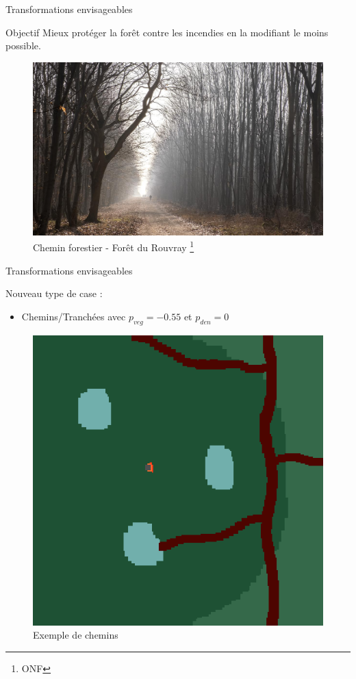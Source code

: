 \documentclass{beamer}
\begin{document}
\begin{frame}{Transformations envisageables \hyperlink{jump}{\beamerbutton{ }} \hypertarget{13}{\beamerbutton{ }}}
    \begin{block}{Objectif}
        Mieux protéger la forêt contre les incendies en la modifiant le moins possible.
    \end{block}

    \begin{figure}
        \centering
        \includegraphics[width=0.75\linewidth]{pictures/chemin.jpeg}
        \caption{Chemin forestier - Forêt du Rouvray \footnote{ONF}}
        \label{fig:enter-label}
    \end{figure}
\end{frame}

\begin{frame}{Transformations envisageables \hyperlink{jump}{\beamerbutton{ }} \hypertarget{14}{\beamerbutton{ }}}
    \begin{block}{Nouveau type de case :}
        \begin{itemize}
            \item Chemins/Tranchées avec $p_{veg} = -0.55$ et $p_{den} = 0$
        \end{itemize}
    \end{block}

    \begin{figure}
        \centering
        \includegraphics[width=.3\linewidth]{pictures/trans/treach_ex.png}
        \caption{Exemple de chemins}\label{Fig:Data1}
        \label{fig:enter-label}
    \end{figure}
\end{frame}
\end{document}
